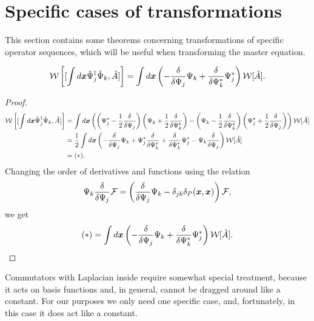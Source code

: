 \section{Specific cases of transformations}

This section contains some theorems concerning transformations of specific operator sequences,
which will be useful when transforming the master equation.

\begin{theorem}
\label{thm:formalism:transformations:w-commutator1}
\[
	\mathcal{W} \left[ [\int d\boldsymbol{x} \hat{\Psi}_j^\dagger \hat{\Psi}_k, \hat{A}] \right]
	= \int d\boldsymbol{x} \left(
		- \frac{\delta}{\delta \Psi_j} \Psi_k
		+ \frac{\delta}{\delta \Psi_k^*} \Psi_j^*
	\right) \mathcal{W}[\hat{A}].
\]
\end{theorem}
\begin{proof}
\begin{equation*}
\begin{split}
	\mathcal{W} \left[ [\int d\boldsymbol{x} \hat{\Psi}_j^\dagger \hat{\Psi}_k, \hat{A}] \right]
	& = \int d\boldsymbol{x} \left(
		\left(
			\Psi_j^* - \frac{1}{2} \frac{\delta}{\delta \Psi_j}
		\right)
		\left(
			\Psi_k + \frac{1}{2} \frac{\delta}{\delta \Psi_k^*}
		\right)
		- \left(
			\Psi_k - \frac{1}{2} \frac{\delta}{\delta \Psi_k^*}
		\right)
		\left(
			\Psi_j^* + \frac{1}{2} \frac{\delta}{\delta \Psi_j}
		\right)
	\right)
	\mathcal{W}[\hat{A}] \\
	& = \frac{1}{2} \int d\boldsymbol{x} \left(
		- \frac{\delta}{\delta \Psi_j} \Psi_k
		+ \Psi_j^* \frac{\delta}{\delta \Psi_k^*}
		+ \frac{\delta}{\delta \Psi_k^*} \Psi_j^*
		- \Psi_k \frac{\delta}{\delta \Psi_j}
	\right)
	\mathcal{W}[\hat{A}] \\
	& = (*).
\end{split}
\end{equation*}
Changing the order of derivatives and functions using the relation
\[
	\Psi_k \frac{\delta}{\delta \Psi_j} \mathcal{F}
	= \left(
		\frac{\delta}{\delta \Psi_j} \Psi_k
		- \delta_{jk} \delta_P(\boldsymbol{x}, \boldsymbol{x})
	\right) \mathcal{F},
\]
we get
\[
	(*) = \int d\boldsymbol{x} \left(
		- \frac{\delta}{\delta \Psi_j} \Psi_k
		+ \frac{\delta}{\delta \Psi_k^*} \Psi_j^*
	\right)
	\mathcal{W}[\hat{A}].
	\qedhere
\]
\end{proof}

Commutators with Laplacian inside require somewhat special treatment,
because it acts on basis functions and, in general, cannot be dragged around like a constant.
For our purposes we only need one specific case,
and, fortunately, in this case it does act like a constant.


